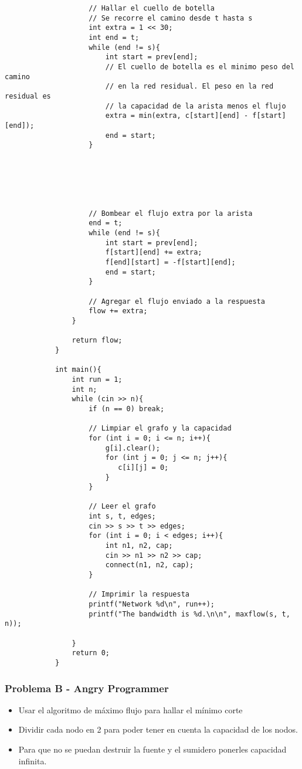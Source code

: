 \documentclass{beamer}
\begin{document}
\begin{frame}
\begin{lstlisting}
			        // Hallar el cuello de botella
			        // Se recorre el camino desde t hasta s
			        int extra = 1 << 30;
			        int end = t;
			        while (end != s){
			            int start = prev[end];
			            // El cuello de botella es el minimo peso del camino 
			            // en la red residual. El peso en la red residual es 
			            // la capacidad de la arista menos el flujo
			            extra = min(extra, c[start][end] - f[start][end]);
			            end = start;
			        }






			        // Bombear el flujo extra por la arista
			        end = t;
			        while (end != s){
			            int start = prev[end];
			            f[start][end] += extra;
			            f[end][start] = -f[start][end];
			            end = start;
			        }

			        // Agregar el flujo enviado a la respuesta
			        flow += extra;
			    }

			    return flow;
			}

			int main(){
			    int run = 1;
				int n;
			    while (cin >> n){
			        if (n == 0) break;

			        // Limpiar el grafo y la capacidad
			        for (int i = 0; i <= n; i++){
			            g[i].clear();
			            for (int j = 0; j <= n; j++){
			               c[i][j] = 0; 
			            }
			        }

			        // Leer el grafo
			        int s, t, edges;
			        cin >> s >> t >> edges;
			        for (int i = 0; i < edges; i++){
			            int n1, n2, cap;
			            cin >> n1 >> n2 >> cap;
			            connect(n1, n2, cap);
			        }

			        // Imprimir la respuesta
			        printf("Network %d\n", run++);
			        printf("The bandwidth is %d.\n\n", maxflow(s, t, n));

			    }
			    return 0;
			}
		\end{lstlisting}
	\end{frame}
	
	\begin{frame}
		\frametitle{Problema B - Angry Programmer}
		\begin{itemize}
			\item Usar el algoritmo de máximo flujo para hallar el mínimo corte
			\item Dividir cada nodo en 2 para poder tener en cuenta la capacidad de los nodos.
			\item Para que no se puedan destruir la fuente y el sumidero ponerles capacidad infinita.
		\end{itemize}
	\end{frame}
	
\end{document}
